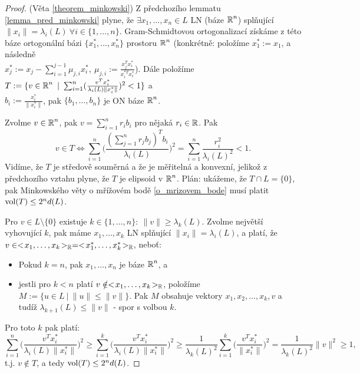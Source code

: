 \begin{proof}(Věta \ref{theorem_minkowski})
Z předchozího lemmatu \ref{lemma_pred_minkowski} plyne, že $\exists x_1,\dots,x_n \in L$ LN (báze $\operatorname{\mathbb{R}}^n$) splňující $\|x_i\| = \lambda_i(L) \ \forall i \in \{1,\dots,n\}$. Gram-Schmidtovou ortogonalizací získáme z této báze ortogonální bázi $\{x_1^*,\dots,x_n^*\}$ prostoru $\operatorname{\mathbb{R}}^n$ (konkrétně: položíme $x_1^* := x_1$, a následně\\$x_j^* := x_j - \sum_{i=1}^{j-1} \mu_{j,i} x_i^*, \ \mu_{j,i} := \frac{x_j^Tx_i^*}{x_i^{*T}x_i^*}$). Dále položíme $T := \{v \in \Real^n \ | \ \sum_{i=1}^n(\frac{v^Tx_i^*}{\lambda_i(L)\|x_i^*\|})^2 < 1\}$ a\\$b_i := \frac{x_i^*}{\|x_i^*\|}$, pak $\{b_1,\dots,b_n\}$ je ON báze $\operatorname{\mathbb{R}}^n$.

Zvolme $v \in \operatorname{\mathbb{R}}^n$, pak $v = \sum_{i=1}^n r_i b_i$ pro nějaká $r_i \in \operatorname{\mathbb{R}}$. Pak $$v \in T \iff \sum_{i=1}^n\bigg(\frac{(\sum_{j=1}^n r_j b_j)^Tb_i}{\lambda_i(L)}\bigg)^2 = \sum_{i=1}^n \frac{r_i^2}{\lambda_i(L)^2}  < 1.$$
Vidíme, že $T$ je středově souměrná a že je měřitelná a konvexní, jelikož z předchozího vztahu plyne, že $T$ je elipsoid v $\operatorname{\mathbb{R}}^n$. Plán: ukážeme, že $T \cap L = \{0\}$, pak Minkowského věty o mřížovém bodě \ref{o_mrizovem_bode} musí platit $\operatorname{vol}(T) \leq 2^nd(L)$.

Pro $v \in L \setminus \{0\}$ existuje $k \in \{1,\dots,n\}: \ \|v\| \geq \lambda_k(L)$. Zvolme největší vyhovující $k$, pak máme $x_1,\dots,x_k$ LN splňující $\|x_i\| = \lambda_i(L)$, a platí, že $v \in <\!x_1,\ldots,x_k\!>_{\operatorname{\mathbb{R}}} = <\!x_1^*,\ldots,x_k^*\!>_{\operatorname{\mathbb{R}}}$, neboť:
\begin{itemize}
    \item Pokud $k=n$, pak $x_1,\ldots,x_n$ je báze $\operatorname{\mathbb{R}}^n$, a
    \item jestli pro $k<n$ platí $v\notin<\!x_1,\ldots,x_k\!>_{\operatorname{\mathbb{R}}}$, položíme $M:=\{u\in L \ | \ \|u\|\leq\|v\| \}$. Pak $M$ obsahuje vektory $x_1,x_2,\ldots,x_k,v$ a tudíž $\lambda_{k+1}(L)\leq\|v\|$ - spor s volbou $k$.
\end{itemize}
Pro toto $k$ pak platí: $$\sum_{i=1}^n\bigg(\frac{v^Tx_i^*}{\lambda_i(L)\|x_i^*\|}\bigg)^2 \geq \sum_{i=1}^k\bigg(\frac{v^Tx_i^*}{\lambda_i(L)\|x_i^*\|}\bigg)^2 \geq \frac{1}{\lambda_k(L)^2}\sum_{i=1}^k\bigg(\frac{v^Tx_i^*}{\|x_i^*\|}\bigg)^2 = \frac{1}{\lambda_k(L)^2}\|v\|^2 \geq 1,$$
t.j. $v \notin T$, a tedy $\operatorname{vol}(T) \leq 2^nd(L)$.


\end{proof}
